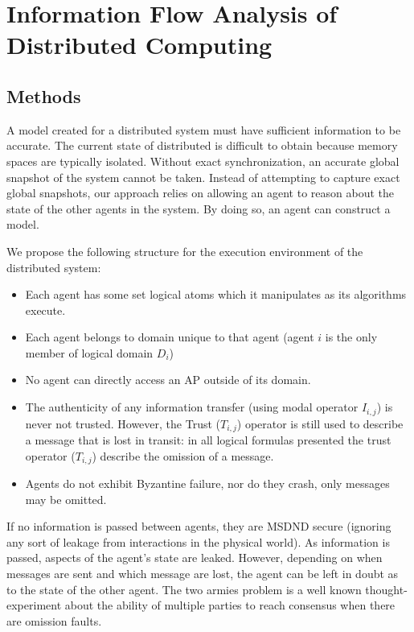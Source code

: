 

\chapter{Information Flow Analysis of Distributed Computing}


\section{Methods}

A model created for a distributed system must have sufficient information to be accurate.
The current state of distributed is difficult to obtain because memory spaces are typically isolated.
Without exact synchronization, an accurate global snapshot of the system cannot be taken.
Instead of attempting to capture exact global snapshots, our approach relies on allowing an agent to reason about the state of the other agents in the system.
By doing so, an agent can construct a model.

We propose the following structure for the execution environment of the distributed system:
\begin{itemize}
    \item Each agent has some set logical atoms which it manipulates as its algorithms execute.
    \item Each agent belongs to domain unique to that agent (agent $i$ is the only member of logical domain $D_i$)
    \item No agent can directly access an \ac{AP} outside of its domain.
    \item The authenticity of any information transfer (using modal operator $I_{i,j}$) is never not trusted. However, the Trust ($T_{i,j}$) operator is still used to describe a message that is lost in transit: in all logical formulas presented the trust operator ($T_{i,j}$) describe the omission of a message.
    \item Agents do not exhibit Byzantine failure, nor do they crash, only messages may be omitted.
\end{itemize}

If no information is passed between agents, they are MSDND secure (ignoring any sort of leakage from interactions in the physical world).
As information is passed, aspects of the agent's state are leaked.
However, depending on when messages are sent and which message are lost, the agent can be left in doubt as to the state of the other agent.
The two armies problem is a well known thought-experiment about the ability of multiple parties to reach consensus when there are omission faults.

